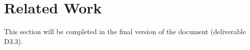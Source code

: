 
\section{Related Work}
\label{sec:related-work}

This section will be completed in the final version of the document (deliverable D3.3).

